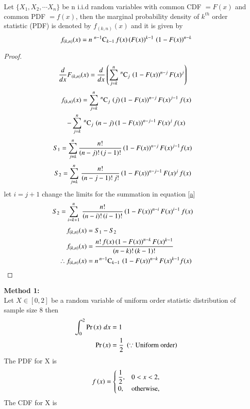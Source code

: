 \documentclass[journal,12pt,twocolumn]{IEEEtran}
\begin{document}
\begin{theorem}
Let $\{X_1, X_2, \cdots X_n\}$ be n i.i.d random variables with common CDF $= F(x)$ and common PDF $= f(x)$, 
then the marginal probability density of $k^{th}$ order statistic (PDF) is denoted by $f_{(k,n)}(x)$  and it
is given by
\begin{align}
f_{(k,n)}(x) = n\;{}^{n-1}\mathrm{C}_{k-1}\,f(x)\,(F(x))^{k-1}\,\left(1-F(x)\right)^{n-k} \label{eqn_2}
\end{align}
\label{th2}
\end{theorem}
\begin{proof}
\begin{align}
\dfrac{d}{dx} F_{(k,n)}(x) &= \dfrac{d}{dx}\left(\sum_{j=k}^{n}\,{}^{n}\mathrm{C}_{j}\,\left(1-F(x)\right)^{n-j} F(x)^{j}\right) 
 \end{align}
\begin{multline}
f_{(k,n)}(x) = \sum_{j=k}^{n}\,{}^{n}\mathrm{C}_{j}\,\left(j\right)\left(1-F(x)\right)^{n-j}F(x)^{j-1}\,f(x)  \\
                -\sum_{j=k}^{n}\,{}^{n}\mathrm{C}_{j}\,\left(n-j\right)\left(1-F(x)\right)^{n-j-1}F(x)^{j}\,f(x) 
\end{multline}
\begin{align}
S_1  &= \sum_{j=k}^{n} \dfrac{n!}{(n-j)!\,(j-1)!}\left(1-F(x)\right)^{n-j}F(x)^{j-1} f(x) 
\end{align}
\begin{align}
S_2  &= \sum_{j=k}^{n}\,\dfrac{n!}{(n-j-1)!\,j!}\left(1-F(x)\right)^{n-j-1}F(x)^{j}\,f(x) \label{a}
\end{align}
let $i = j+1$ change the limits for the summation in equation \eqref{a}
\begin{align}
S_2  &= \sum_{i=k+1}^{n}\,\dfrac{n!}{(n-i)!\,(i-1)!}\left(1-F(x)\right)^{n-i}F(x)^{i-1}\,f(x)
\end{align}
\begin{align}
f_{(k,n)}(x) &= S_1 - S_2 \\
f_{(k,n)}(x) &= \dfrac{n!\,f(x)\left(1-F(x)\right)^{n-k}F(x)^{k-1}}{(n-k)!\,(k-1)!}\\
\therefore f_{(k,n)}(x) &= n\,{}^{n-1}\mathrm{C}_{k-1}\,\left(1-F(x)\right)^{n-k}F(x)^{k-1} f(x)
\end{align}
\end{proof}
\bigskip
\textbf{Method 1:} \\
Let $X\in[0,2]$ be a random variable of uniform order statistic distribution of sample size 8 then
\begin{align}
 \int_{0}^{2} \Pr\left(x\right)\,dx &= 1 \\
 \Pr\left(x\right)                  &= \dfrac{1}{2}\;\left(\because \text{Uniform order}\right)
\end{align}
The PDF for X is 
\begin{align}
f\left(x\right) = 
 \begin{cases}
  \dfrac{1}{2},      &0<x<2, \\ 
     0, &\text{otherwise,}
 \end{cases} \label{d}
\end{align}
 The CDF for X is 
 
\end{document}
